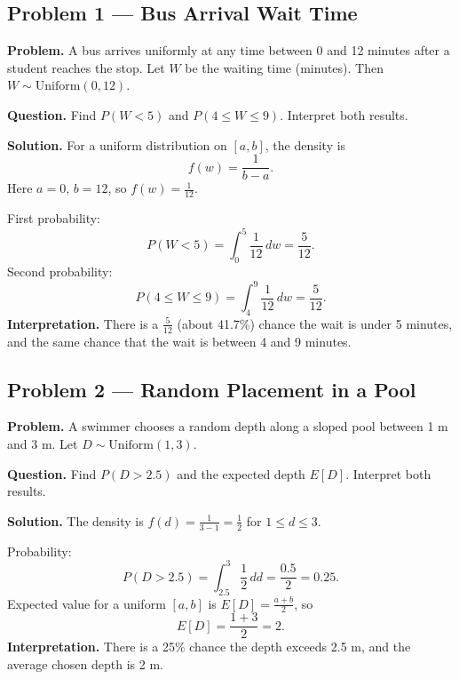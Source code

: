 	
	\begin{ExamProblems}
		
		\hypertarget{c2-ex1}{}
		\item
		\subsection*{Problem 1 — Bus Arrival Wait Time}
		
		\textbf{Problem.}
		A bus arrives uniformly at any time between 0 and 12 minutes after a student reaches the stop.
		Let \(W\) be the waiting time (minutes). Then \(W\sim\text{Uniform}(0,12)\).
		
		\textbf{Question.} Find \(P(W<5)\) and \(P(4\le W\le 9)\). Interpret both results.
		
		\textbf{Solution.}
		For a uniform distribution on \([a,b]\), the density is
		\[
		f(w)=\frac{1}{b-a}.
		\]
		Here \(a=0\), \(b=12\), so \(f(w)=\frac{1}{12}\).
		
		First probability:
		\[
		P(W<5)=\int_0^5 \frac{1}{12}\,dw=\frac{5}{12}.
		\]
		Second probability:
		\[
		P(4\le W\le 9)=\int_4^9 \frac{1}{12}\,dw=\frac{5}{12}.
		\]
		\textbf{Interpretation.} There is a \(\frac{5}{12}\) (about 41.7\%) chance the wait is under 5 minutes,
		and the same chance that the wait is between 4 and 9 minutes.
		
		
		\hypertarget{c2-ex2}{}
		\item
		\subsection*{Problem 2 — Random Placement in a Pool}
		
		\textbf{Problem.}
		A swimmer chooses a random depth along a sloped pool between 1 m and 3 m.
		Let \(D\sim\text{Uniform}(1,3)\).
		
		\textbf{Question.} Find \(P(D>2.5)\) and the expected depth \(E[D]\). Interpret both results.
		
		\textbf{Solution.}
		The density is \(f(d)=\frac{1}{3-1}=\frac{1}{2}\) for \(1\le d\le 3\).
		
		Probability:
		\[
		P(D>2.5)=\int_{2.5}^3 \frac{1}{2}\,dd=\frac{0.5}{2}=0.25.
		\]
		Expected value for a uniform \([a,b]\) is \(E[D]=\frac{a+b}{2}\), so
		\[
		E[D]=\frac{1+3}{2}=2.
		\]
		\textbf{Interpretation.} There is a 25\% chance the depth exceeds 2.5 m, and the average
		chosen depth is 2 m.
		
	\end{ExamProblems}
	
